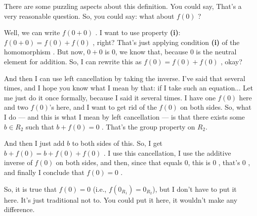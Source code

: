 \begin{speech}[00:20:03 - 00:22:25]
There are some puzzling aspects about this definition. You could say,  That's a very reasonable question. So, you could say: what about $f(0)$ ?

Well, we can write $f(0 + 0)$ . I want to use property \textbf{(i)}: $f(0 + 0) = f(0) + f(0)$ , right? That's just applying condition \textbf{(i)} of the homomorphism . But now, $0 + 0$ is $0$, we know that, because $0$ is the neutral element for addition. So, I can rewrite this as $f(0) = f(0) + f(0)$ , okay?

And then I can use left cancellation by taking the inverse. I've said that several times, and I hope you know what I mean by that: if I take such an equation... Let me just do it once formally, because I said it several times. I have one $f(0)$ here and two $f(0)$'s here, and I want to get rid of the $f(0)$ on both sides. So, what I do --- and this is what I mean by left cancellation --- is that there exists some $b \in R_2$  such that $b + f(0) = 0$ . That's the group property on $R_2$.

And then I just add $b$ to both sides of this. So, I get $b + f(0) = b + f(0) + f(0)$ . I use this cancellation, I use the additive inverse of $f(0)$ on both sides, and then, since that equals $0$, this is $0$ , that's $0$ , and finally I conclude that $f(0) = 0$ .

So, it is true that $f(0) = 0$ (i.e., $f(0_{R_1}) = 0_{R_2}$), but I don't have to put it here. It's just traditional not to. You could put it here, it wouldn't make any difference.
\end{speech}

